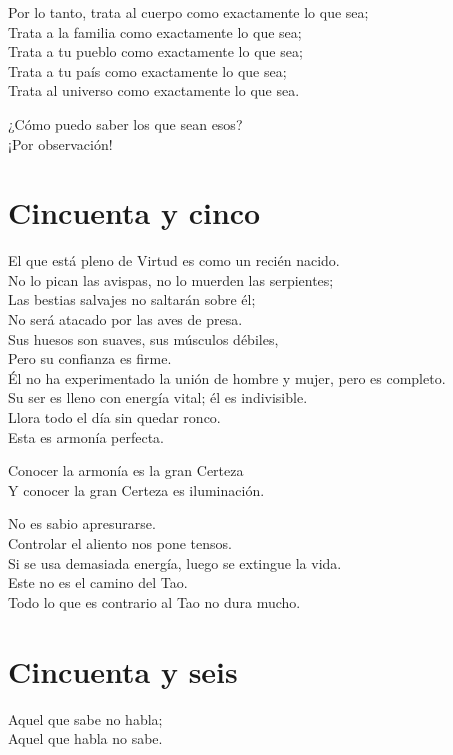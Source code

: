 \documentclass[book,b5paper,hidelinks,final]{memoir}
\begin{document}
	Por lo tanto, trata al cuerpo como exactamente lo que sea;\\
	Trata a la familia como exactamente lo que sea;\\
	Trata a tu pueblo como exactamente lo que sea;\\
	Trata a tu país como exactamente lo que sea;\\
	Trata al universo como exactamente lo que sea.
	
	¿Cómo puedo saber los que sean esos?\\
	¡Por observación!
	
	\chapter*{Cincuenta y cinco}
	
	El que está pleno de Virtud es como un recién nacido.\\
	No lo pican las avispas, no lo muerden las serpientes;\\
	Las bestias salvajes no saltarán sobre él;\\
	No será atacado por las aves de presa.\\
	Sus huesos son suaves, sus músculos débiles,\\
	Pero su confianza es firme.\\
	Él no ha experimentado la unión de hombre y mujer, pero es completo.\\
	Su ser es lleno con energía vital; él es indivisible.\\
	Llora todo el día sin quedar ronco.\\
	Esta es armonía perfecta.
	
	Conocer la armonía es la gran Certeza\\
	Y conocer la gran Certeza es iluminación.
	
	No es sabio apresurarse.\\
	Controlar el aliento nos pone tensos.\\
	Si se usa demasiada energía, luego se extingue la vida.\\
	Este no es el camino del Tao.\\
	Todo lo que es contrario al Tao no dura mucho.
	
	\chapter*{Cincuenta y seis}
	
	Aquel que sabe no habla;\\
	Aquel que habla no sabe.
	
\end{document}
